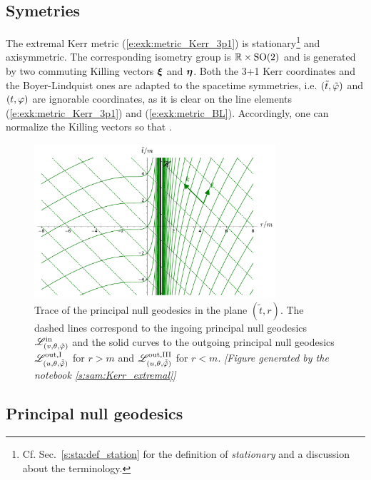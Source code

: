 \subsection{Symetries}

The extremal Kerr metric (\ref{e:exk:metric_Kerr_3p1}) is stationary\footnote{Cf.
Sec.~\ref{s:sta:def_station} for the definition of \emph{stationary} and a discussion
about the terminology.} and axisymmetric. The corresponding isometry group is $\mathbb{R}\times\mathrm{SO}(2)$ and is generated
by two commuting Killing vectors $\bm{\xi}$ and $\bm{\eta}$. Both the 3+1 Kerr coordinates and
the Boyer-Lindquist ones are adapted to the spacetime symmetries, i.e. $({\tilde t},{\tilde\varphi})$ and
$(t,\varphi)$ are ignorable coordinates, as it is clear on the line elements (\ref{e:exk:metric_Kerr_3p1})
and (\ref{e:exk:metric_BL}). Accordingly, one can normalize the Killing vectors so that
\be
    \qand
    \encadre{\w{\eta} = \wpar_{\tph} = \wpar_\ph} .
\ee

\begin{figure}
\centerline{\includegraphics[width=0.8\textwidth]{exk_princ_null_geod.pdf}}
\caption[]{\label{f:exk:princ_null_geod} \footnotesize
Trace of the principal null geodesics in the plane
$(\tilde{t}, r)$. The dashed lines correspond to the
ingoing principal null geodesics $\mathscr{L}^{\rm in}_{(v,\theta,{\tilde\varphi})}$
and the solid curves to the
outgoing principal null geodesics $\mathscr{L}^{\rm out,I}_{(u,\theta,\tilde{{\tilde\varphi}})}$
for $r>m$ and $\mathscr{L}^{\rm out,III}_{(u,\theta,\tilde{{\tilde\varphi}})}$ for $r<m$.
\textsl{[Figure generated by the notebook \ref{s:sam:Kerr_extremal}]}
}
\end{figure}



\subsection{Principal null geodesics}

